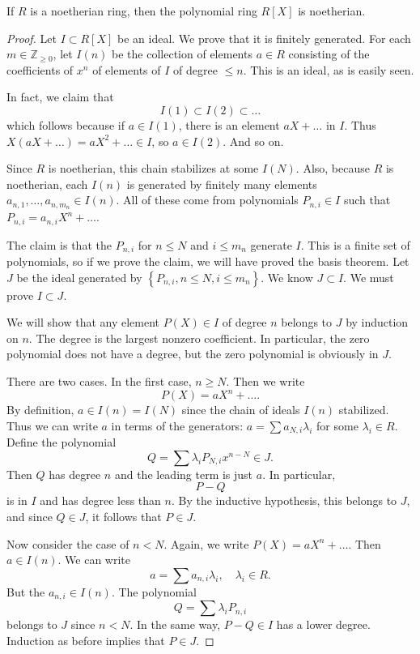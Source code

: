 \begin{theorem}
If $R$ is a noetherian ring, then the polynomial ring $R[X]$ is noetherian.
\end{theorem} 
\begin{proof} 
Let $I \subset R[X]$ be an ideal. We prove that it is finitely generated. For
each $m \in \mathbb{Z}_{\geq 0}$, let $I(n)$ be the collection of elements 
$ a\in R$ consisting of the coefficients of $x^n$ of elements of $I$ of degree
$\leq n$.
This is an ideal, as is easily seen.

In fact, we claim that
\[ I(1) \subset I(2) \subset \dots  \]
which follows because if $ a\in I(1)$, there is an element $aX + \dots$ in $I$.
Thus $X(aX + \dots) = aX^2 + \dots \in I$, so $a \in I(2)$. And so on.

Since $R$ is noetherian, this chain stabilizes at some $I(N). $
Also, because $R$ is noetherian, each $I(n)$ is generated by finitely many
elements $a_{n,1}, \dots, a_{n, m_n} \in I(n)$. All of these come from polynomials
$P_{n,i} \in I$ such that $P_{n,i} = a_{n,i} X^n + \dots$.

The claim is that the $P_{n,i}$ for $n \leq N$ and $i \leq m_n$ generate $I$. 
This is a finite set of polynomials, so if we prove the claim, we will have
proved the basis theorem. Let $J$ be the ideal generated by
$\left\{P_{n,i}, n \leq N, i \leq m_n \right\}$. We know $J \subset I$. We must
prove $I \subset J$.

We will show that any element $P(X) \in I$ of degree $n$ belongs to $J$ by
induction on $n$. The degree is the largest nonzero coefficient. In particular,
the zero polynomial does not have a degree, but the zero polynomial is
obviously in $J$.

There are two cases. In the first case, $n \geq N$. Then we write
\[ P(X) = a X^n + \dots .  \] By definition, $a \in I(n) = I(N)$ since the
chain of ideals $I(n)$ stabilized. Thus we can write $a$ in terms of the
generators:  $a = \sum a_{N, i} \lambda_i$ for some
$\lambda_i \in R$. Define the polynomial
\[ Q = \sum \lambda_i P_{N, i} x^{n-N} \in J.  \] Then $Q$ has degree $n$ and
the leading term is just $a$.  In particular, 
\[ P - Q  \]
is in $I$ and has degree less than $n$. By the inductive hypothesis, this
belongs to $J$, and since $Q \in J$, it follows that $P \in J$. 

Now consider the case of $n < N$. 
Again, we write $P(X) = a X^n + \dots$. Then $a \in I(n)$.  We can write 
\[ a = \sum a_{n,i} \lambda_i, \quad \lambda_i \in R.  \]
But the $a_{n,i} \in I(n)$. The polynomial
\[ Q = \sum \lambda_i P_{n,i}   \]
belongs to $J$ since $n  < N$. In the same way, $P-Q \in I$ has a lower degree.
Induction as before implies that $P \in J$. 
\end{proof} 


